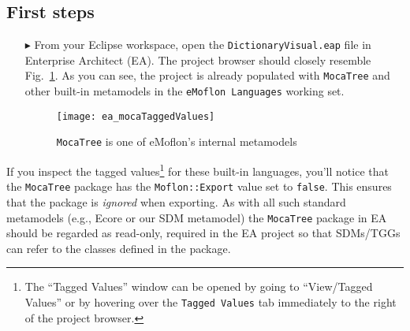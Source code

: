 \newpage
\hypertarget{initialize vis}{}
\subsection{First steps}
\genHeader

\begin{itemize}

\item[$\blacktriangleright$] From your Eclipse workspace, open the \texttt{Dict\-ion\-ary\-Vi\-su\-al.eap} file in Enterprise Architect (EA). The project browser should
closely resemble Fig.~\ref{ea:mocaTagged}. As you can see, the project is already populated with \texttt{MocaTree} and other built-in metamodels
in the \texttt{eMoflon Languages} working set.

\vspace{0.5cm}

\begin{figure}[htpb]
\begin{center}
  \texttt{[image: ea\_mocaTaggedValues]}
  \caption{\texttt{MocaTree} is one of eMoflon's internal metamodels}
  \label{ea:mocaTagged}
\end{center}
\end{figure}

\end{itemize}

\vspace{-0.5cm}

If you inspect the tagged values\footnote{The ``Tagged Values'' window can be opened by going to ``View/Tagged Values'' or by hovering over the \texttt{Tagged
Values} tab immediately to the right of the project browser.} for these built-in languages, you'll notice that the \texttt{MocaTree} package has the
\texttt{Moflon::Export} value set to \texttt{false}. This ensures that the package is \emph{ignored} when exporting. As with all such standard metamodels (e.g.,
Ecore or our SDM metamodel) the \texttt{MocaTree} package in EA should be regarded as read-only, required in the EA project so that SDMs/TGGs can refer to
the classes defined in the package.

